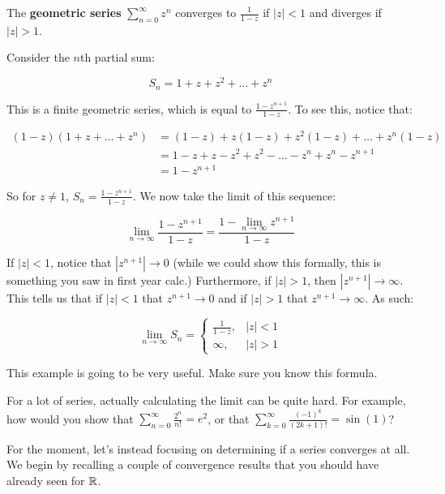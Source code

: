 \begin{ex}{}{} The {\bf geometric series} $\sum_{n = 0}^\infty z^n$ converges to $\frac{1}{1-z}$ if $|z| < 1$ and diverges if $|z| > 1$.

Consider the $n$th partial sum:

$$S_n = 1 + z + z^2 + \dots + z^n$$

This is a finite geometric series, which is equal to $\frac{1 - z^{n+1}}{1-z}$. To see this, notice that:

\begin{align*}(1-z)(1+ z + \dots + z^n) &= (1-z) + z(1-z) + z^2(1-z) + \dots + z^n(1-z) \\
&= 1 - z + z - z^2 + z^2 - \dots - z^n + z^n - z^{n+1}\\
&= 1-z^{n+1}
\end{align*}

So for $z\ne 1$, $S_n = \frac{1-z^{n+1}}{1-z}$. We now take the limit of this sequence:

$$\lim_{n\rightarrow \infty} \frac{1 - z^{n+1}}{1-z} = \frac{1 - \lim_{n \rightarrow \infty} z^{n+1}}{1-z}$$

If $|z| < 1$, notice that $|z^{n+1}|\rightarrow 0$ (while we could show this formally, this is something you saw in first year calc.) Furthermore, if $|z| > 1$, then $|z^{n+1}|\rightarrow \infty$. This tells us that if $|z| < 1$ that $z^{n+1}\rightarrow 0$ and if $|z| > 1$ that $z^{n+1}\rightarrow \infty$. As such:

$$\lim_{n\rightarrow \infty} S_n = \begin{cases} \frac{1}{1-z}, & |z| < 1\\\infty, &|z| > 1\end{cases}$$
\end{ex}

This example is going to be very useful. Make sure you know this formula.

For a lot of series, actually calculating the limit can be quite hard. For example, how would you show that $\sum_{n = 0}^\infty \frac{2^n}{n!} = e^2$, or that $\sum_{k = 0}^\infty \frac{(-1)^k}{(2k+1)!} = \sin(1)$?

For the moment, let's instead focusing on determining if a series converges at all. We begin by recalling a couple of convergence results that you should have already seen for $\mathbb{R}$.

